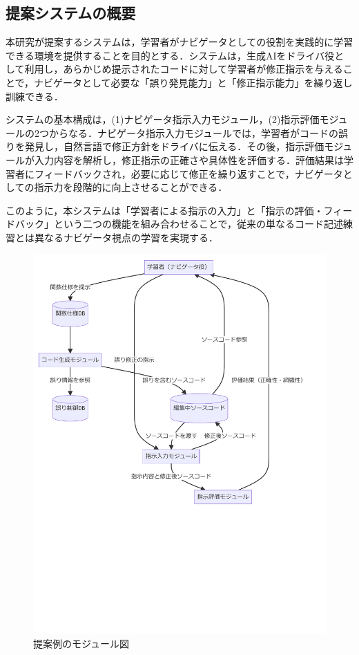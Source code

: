 \documentclass[twoside,twocolumn,10pt]{jsarticle}
\begin{document}
\subsection{提案システムの概要}
本研究が提案するシステムは，学習者がナビゲータとしての役割を実践的に学習できる環境を提供することを目的とする．システムは，生成AIをドライバ役として利用し，あらかじめ提示されたコードに対して学習者が修正指示を与えることで，ナビゲータとして必要な「誤り発見能力」と「修正指示能力」を繰り返し訓練できる．

システムの基本構成は，(1)ナビゲータ指示入力モジュール，(2)指示評価モジュールの2つからなる．ナビゲータ指示入力モジュールでは，学習者がコードの誤りを発見し，自然言語で修正方針をドライバに伝える．その後，指示評価モジュールが入力内容を解析し，修正指示の正確さや具体性を評価する．評価結果は学習者にフィードバックされ，必要に応じて修正を繰り返すことで，ナビゲータとしての指示力を段階的に向上させることができる．

このように，本システムは「学習者による指示の入力」と「指示の評価・フィードバック」という二つの機能を組み合わせることで，従来の単なるコード記述練習とは異なるナビゲータ視点の学習を実現する．

\begin{figure}[h]
  \centering
  \includegraphics[width=0.9\linewidth, trim=0 500 0 0, clip]{module.pdf}
  \caption{提案例のモジュール図}
\end{figure}
\end{document}

